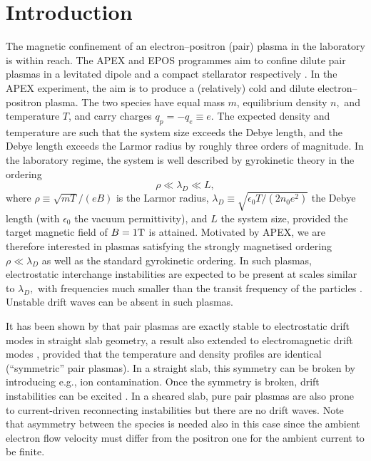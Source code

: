 \documentclass{jpp}
\newcommand{\lambdaD}{\lambda_D}
\begin{document}
\section{Introduction}\label{sec:intro}
The magnetic confinement of an electron--positron (pair) plasma in the laboratory is within reach. The APEX and EPOS programmes aim to confine dilute pair plasmas in a levitated dipole and a compact stellarator respectively \citep{Pedersen2012, Stoneking2020}. In the APEX experiment, the aim is to produce a (relatively) cold and dilute electron--positron plasma. The two species have equal mass $m$, equilibrium density $n,$ and temperature $T$, and carry charges $q_p = -q_e \equiv e$. The expected density and temperature are such that the system size exceeds the Debye length, and the Debye length exceeds the Larmor radius by roughly three orders of magnitude. In the laboratory regime, the system is well described by gyrokinetic theory \citep{Abel2013} in the ordering \begin{equation} \rho \ll \lambdaD \ll L,\label{eq:ordering} \end{equation} where $\rho \equiv \sqrt{mT}/(eB)$ is the Larmor radius, $\lambdaD \equiv \sqrt{\epsilon_0 T/(2 n_0 e^2)}$ the Debye length (with $\epsilon_0$ the vacuum permittivity), and $L$ the system size, provided the target magnetic field of $B = 1\rm{T}$ is attained. Motivated by APEX, we are therefore interested in plasmas satisfying the strongly magnetised ordering $\rho \ll \lambda_{D}$ as well as the standard gyrokinetic ordering. In such plasmas, electrostatic interchange instabilities are expected to be present at scales similar to $\lambdaD,$ with frequencies much smaller than the transit frequency of the particles \citep{Helander2014}. Unstable drift waves can be absent in such plasmas.

It has been shown by \citet{Helander2014} that pair plasmas are exactly stable to electrostatic drift modes in straight slab geometry, a result also extended to electromagnetic drift modes \citep{HelanderConnor2016}, provided that the temperature and density profiles are identical (``symmetric'' pair plasmas). In a straight slab, this symmetry can be broken by introducing e.g., ion contamination. Once the symmetry is broken, drift instabilities can be excited \citep{Mishchenko2018, KennedyMishchenko2019}. In a sheared slab, pure pair plasmas are also prone to current-driven reconnecting instabilities \citep{Zocco2017} but there are no drift waves. Note that asymmetry between the species is needed also in this case since the ambient electron flow velocity must differ from the positron one for the ambient current to be finite. 
\end{document}
